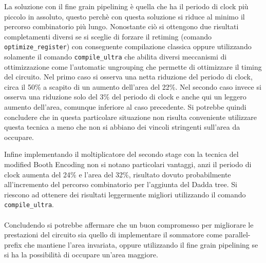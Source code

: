 La soluzione con il fine grain pipelining è quella che ha il periodo di clock più piccolo in assoluto, questo perchè con questa soluzione si riduce al minimo il percorso combinatorio più lungo. Nonostante ciò si ottengono due risultati completamenti diversi se si sceglie di forzare il retiming (comando \texttt{optimize\_register}) con conseguente compilazione classica oppure utilizzando solamente il comando \texttt{compile\_ultra} che abilita diversi meccanismi di ottimizzazione come l'automatic ungrouping che permette di ottimizzare il timing del circuito.  Nel primo caso si osserva una netta riduzione del periodo di clock, circa il 50\% a scapito di un aumento dell'area del 22\%. Nel secondo caso invece si osserva una riduzione solo del 3\% del periodo di clock e anche qui un leggero aumento dell'area, comunque inferiore al caso precedente. Si potrebbe quindi concludere che in questa particolare situazione non risulta conveniente utilizzare questa tecnica a meno che non si abbiano dei vincoli stringenti sull'area da occupare.

Infine implementando il moltiplicatore del secondo stage con la tecnica del modified Booth Encoding non si notano particolari vantaggi, anzi il periodo di clock aumenta del 24\% e l'area del 32\%, risultato dovuto probabilmente all'incremento del percorso combinatorio per l'aggiunta del Dadda tree. Si riescono ad ottenere dei risultati leggermente migliori utilizzando il comando \texttt{compile\_ultra}.
\\
\\
Concludendo si potrebbe affermare che un buon compromesso per migliorare le prestazioni del circuito sia quello di implementare il sommatore come parallel-prefix che mantiene l'area invariata, oppure utilizzando il fine grain pipelining se si ha la possibilità di occupare un'area maggiore.
